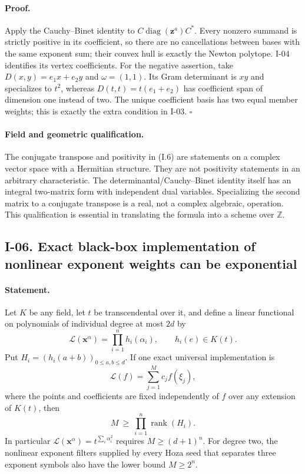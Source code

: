 \paragraph{Proof.}
Apply the Cauchy--Binet identity to
$C\operatorname{diag}(\mathbf z^a)C^*$.
Every nonzero summand is strictly positive in its coefficient, so
there are no cancellations between bases with the same exponent
sum; their convex hull is exactly the Newton polytope.  I-04
identifies its vertex coefficients.  For the negative assertion,
take $D(x,y)=e_1x+e_2y$ and $\omega=(1,1)$.  Its Gram determinant
is $xy$ and specializes to $t^2$, whereas
$D(t,t)=t(e_1+e_2)$ has coefficient span of dimension one instead
of two.  The unique coefficient basis has two equal member weights;
this is exactly the extra condition in I-03. \hfill$\square$

\paragraph{Field and geometric qualification.}
The conjugate transpose and positivity in (I.6) are statements on
a complex vector space with a Hermitian structure.  They are not
positivity statements in an arbitrary characteristic.  The
determinantal/Cauchy--Binet identity itself has an integral
two-matrix form with independent dual variables.  Specializing the
second matrix to a conjugate transpose is a real, not a complex
algebraic, operation.  This qualification is essential in translating
the formula into a scheme over $\mathbb Z$.

\subsection{I-06. Exact black-box implementation of nonlinear exponent weights can be exponential}
\label{I-06}

\paragraph{Statement.}
Let $K$ be any field, let $t$ be transcendental over it, and define
a linear functional on polynomials of individual degree at most $2d$
by
\[
 \mathcal L(\mathbf x^\alpha)=\prod_{i=1}^n h_i(\alpha_i),
 \qquad h_i(e)\in K(t).
\]
Put $H_i=(h_i(a+b))_{0\le a,b\le d}$.
If one exact universal implementation is
\[
 \mathcal L(f)=\sum_{j=1}^M c_j f(\xi_j),
\tag{I.7}
\]
where the points and coefficients are fixed independently of $f$
over any extension of $K(t)$, then
\[
 M\ \ge\ \prod_{i=1}^n\operatorname{rank}(H_i).
\tag{I.8}
\]
In particular $\mathcal L(\mathbf x^\alpha)=
t^{\sum_i\alpha_i^2}$ requires $M\ge(d+1)^n$.
For degree two, the nonlinear exponent filters supplied by every
Hoza seed that separates three exponent symbols also have the
lower bound $M\ge2^n$.

